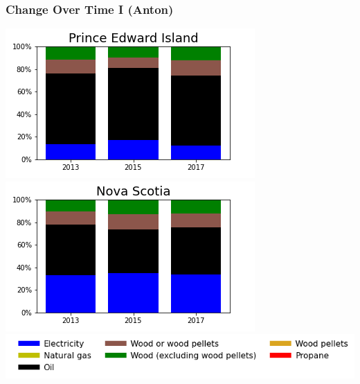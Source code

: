\documentclass{beamer}
\begin{document}
\begin{frame}
\frametitle{Change Over Time I (Anton)}
\begin{center}
\includegraphics[width=0.5\linewidth]{pe.png}%
\includegraphics[width=0.5\linewidth]{ns.png}\\
\includegraphics[width=0.8\linewidth]{leg_bar.png}
\end{center}
\end{frame}
\end{document}

